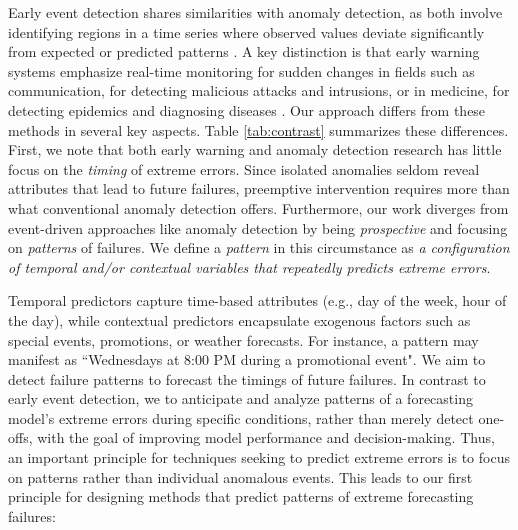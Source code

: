 \documentclass[ijds,sglanonrev]{informs4}
\begin{document}
Early event detection shares similarities with anomaly detection, as both involve identifying regions in a time series where observed values deviate significantly from expected or predicted patterns \citep{wang2021}. A key distinction is that early warning systems emphasize real-time monitoring for sudden changes in fields such as communication, for detecting malicious attacks and intrusions, or in medicine, for detecting epidemics and diagnosing diseases \citep{deljac2015, shmueli2010}. Our approach differs from these methods in several key aspects. Table \ref{tab:contrast} summarizes these differences. First, we note that both early warning and anomaly detection research has little focus on the \emph{timing} of extreme errors. Since isolated anomalies seldom reveal attributes that lead to future failures, preemptive intervention requires more than what conventional anomaly detection offers. Furthermore, our work diverges from event-driven approaches like anomaly detection by being \emph{prospective} and focusing on \emph{patterns} of failures. We define a \emph{pattern} in this circumstance as \emph{a configuration of temporal and/or contextual variables that repeatedly predicts extreme errors}. 

Temporal predictors capture time-based attributes (e.g., day of the week, hour of the day), while contextual predictors encapsulate exogenous factors such as special events, promotions, or weather forecasts. For instance, a pattern may manifest as ``Wednesdays at 8:00 PM during a promotional event". We aim to detect failure patterns to forecast the timings of future failures. In contrast to early event detection, we  to anticipate and analyze patterns of a forecasting model’s extreme errors during specific conditions, rather than merely detect one-offs, with the goal of improving model performance and decision-making. Thus, an important principle for techniques seeking to predict extreme errors is to focus on patterns rather than individual anomalous events. This leads to our first principle for designing methods that predict patterns of extreme forecasting failures:

\renewcommand{\arraystretch}{1.3}
\end{document}
